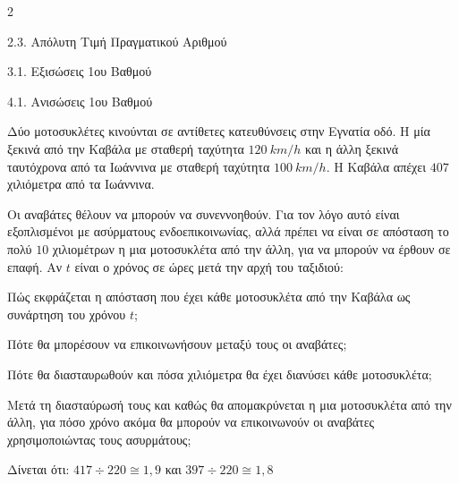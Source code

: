 \begin{ylh}{2}
    \item 2.3. Απόλυτη Τιμή Πραγματικού Αριθμού
    \item 3.1. Εξισώσεις 1ου Βαθμού
    \item 4.1. Ανισώσεις 1ου Βαθμού
\end{ylh}

Δύο μοτοσυκλέτες κινούνται σε αντίθετες κατευθύνσεις στην Εγνατία οδό. Η μία ξεκινά από την Καβάλα με σταθερή ταχύτητα $120\ km/h$ και η άλλη ξεκινά ταυτόχρονα από τα Ιωάννινα με σταθερή ταχύτητα $100\ km/h$. Η Καβάλα απέχει $407$ χιλιόμετρα από τα Ιωάννινα.

\begin{center}

\end{center}

Οι αναβάτες θέλουν να μπορούν να συνεννοηθούν. Για τον λόγο αυτό είναι εξοπλισμένοι με ασύρματους ενδοεπικοινωνίας, αλλά πρέπει να είναι σε απόσταση το πολύ $10$ χιλιομέτρων η μια μοτοσυκλέτα από την άλλη, για να μπορούν να έρθουν σε επαφή. Αν $t$ είναι ο χρόνος σε ώρες μετά την αρχή του ταξιδιού:

\begin{alist}
\item Πώς εκφράζεται η απόσταση που έχει κάθε μοτοσυκλέτα από την Καβάλα ως συνάρτηση του χρόνου $t$;
\item Πότε θα μπορέσουν να επικοινωνήσουν μεταξύ τους οι αναβάτες;
\item Πότε θα διασταυρωθούν και πόσα χιλιόμετρα θα έχει διανύσει κάθε μοτοσυκλέτα;
\item Μετά τη διασταύρωσή τους και καθώς θα απομακρύνεται η μια μοτοσυκλέτα από την άλλη, για πόσο χρόνο ακόμα θα μπορούν να επικοινωνούν οι αναβάτες χρησιμοποιώντας τους ασυρμάτους;

Δίνεται ότι: $417 \div 220 \cong 1{,}9$ και $397 \div 220 \cong 1{,}8$
\end{alist}


